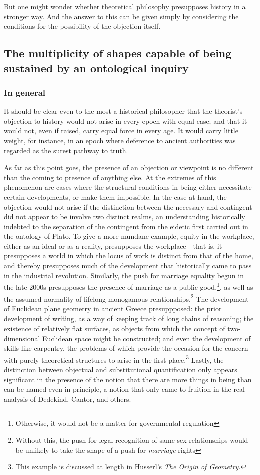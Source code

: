\documentclass[]{article}
\begin{document}
But one might wonder whether theoretical philosophy presupposes history in a stronger way. And the answer to this can be given simply by considering the conditions for the possibility of the objection itself. 

\subsection{The multiplicity of shapes capable of being sustained by an ontological inquiry}
\subsubsection{In general}
It should be clear even to the most a-historical philosopher that the theorist's objection to history would not arise in every epoch with equal ease; and that it would not, even if raised, carry equal force in every age. It would carry little weight, for instance, in an epoch where deference to ancient authorities was regarded as the surest pathway to truth.

As far as this point goes, the presence of an objection or viewpoint is no different than the coming to presence of anything else. At the extremes of this phenomenon are cases where the structural conditions in being either necessitate certain developments, or make them impossible. In the case at hand, the objection would not arise if the distinction between the necessary and contingent did not appear to be involve two distinct realms, an understanding  historically indebted to the separation of the contingent from the eidetic first carried out in the ontology of Plato. To give a more mundane example, equity in the workplace, either as an ideal or as a reality, presupposes the workplace - that is, it presupposes a world in which the locus of work is distinct from that of the home, and thereby presupposes much of the development that historically came to pass in the industrial revolution. Similarly, the push for marriage equality begun in the late 2000s presupposes the presence of marriage as a public good,\footnote{Otherwise, it would not be a matter for governmental regulation}, as well as the assumed normality of lifelong monogamous relationships.\footnote{Without this, the push for legal recognition of same sex relationships would be unlikely to take the shape of a push for \textit{marriage} rights} The development of Euclidean plane geometry in ancient Greece presuppposed: the prior development of writing, as a way of keeping track of long chains of reasoning; the existence of relatively flat surfaces, as objects from which the concept of two-dimensional Euclidean space might be constructed; and even the development of skills like carpentry, the problems of which provide the occasion for the concern with purely theoretical structures to arise in the first place.\footnote{This example is discussed at length in Husserl's \textit{The Origin of Geometry.}} Lastly, the distinction between objectual and substitutional quantification only appears significant in the presence of the notion that there are more things in being than can be named even in principle, a notion that only came to fruition in the real analysis of Dedekind, Cantor, and others. 
\end{document}
